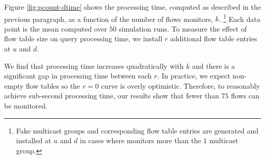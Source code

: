 


Figure \ref{fig:pcount-dtime} shows the processing time, computed as described in the previous paragraph, as a function of the number of flows \pcnt monitors, $k$.
\footnote{Fake multicast groups and corresponding flow table entries are generated and installed at $u$ and $d$ in cases where \pcnt monitors more than the $1$ multicast group.}
Each data point is the mean computed over $50$ simulation runs. To measure the effect of flow table size on query processing time, we install $r$ additional flow table entries at $u$ and $d$.

We find that processing time increases quadratically with $k$ and there is a significant gap in processing time between each $r$.  In practice, we expect non-empty flow tables so the $r=0$ curve
is overly optimistic.  Therefore, to reasonably achieve sub-second processing time, our results show that fewer than $75$ flows can be monitored. 

